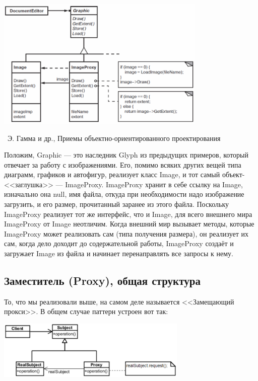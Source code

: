 \documentclass[a5paper]{article}
\newcommand{\attribution}[1] {
    \vspace{-5mm}\begin{flushright}\begin{scriptsize}%
    {\textcopyright\, #1}\end{scriptsize}\end{flushright}
}
\begin{document}
\begin{center}
    \includegraphics[width=0.75\textwidth]{proxyExampleClassDiagram.png}
    \attribution{Э. Гамма и др., Приемы объектно-ориентированного проектирования}
\end{center}

Положим, Graphic --- это наследник Glyph из предыдущих примеров, который отвечает за работу с изображениями. Его, помимо всяких других вещей типа диаграмм, графиков и автофигур, реализует класс Image, и тот самый объект-<<заглушка>> --- ImageProxy. ImageProxy хранит в себе ссылку на Image, изначально она null, имя файла, откуда при необходимости надо изображение загрузить, и его размер, прочитанный заранее из этого файла. Поскольку ImageProxy реализует тот же интерфейс, что и Image, для всего внешнего мира ImageProxy от Image неотличим. Когда внешний мир вызывает методы, которые ImageProxy может реализовать сам (типа получения размера), он реализует их сам, когда дело доходит до содержательной работы, ImageProxy создаёт и загружает Image из файла и начинает перенаправлять все запросы к нему.

\subsection{Заместитель (Proxy), общая структура}

То, что мы реализовали выше, на самом деле называется <<Замещающий прокси>>. В общем случае паттерн устроен вот так:

\begin{center}
    \includegraphics[width=0.68\textwidth]{proxy.png}
\end{center}
\end{document}
